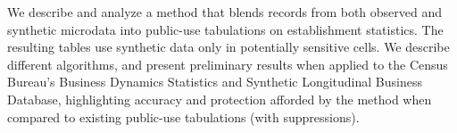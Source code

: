We describe and analyze a method that blends records from both observed and synthetic 
microdata into public-use tabulations on establishment statistics. The resulting tables use 
synthetic data only in potentially sensitive cells. We describe different algorithms, and present 
preliminary results when applied to the Census Bureau's Business Dynamics Statistics and 
Synthetic Longitudinal Business Database, highlighting accuracy and protection afforded by the 
method when compared to existing public-use tabulations (with suppressions). 